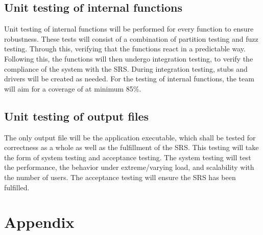 \documentclass[12pt, titlepage]{article}
\begin{document}
\subsection{Unit testing of internal functions}
Unit testing of internal functions will be performed for every function to ensure robustness. These tests will consist of a combination of partition testing and fuzz testing. Through this, verifying that the functions react in a predictable way. Following this, the functions will then undergo integration testing, to verify the compliance of the system with the SRS. During integration testing, stubs and drivers will be created as needed. For the testing of internal functions, the team will aim for a coverage of at minimum 85\%.

\subsection{Unit testing of output files}       
The only output file will be the application executable, which shall be tested for correctness as a whole as well as the fulfillment of the SRS. This testing will take the form of system testing and acceptance testing. The system testing will test the performance, the behavior under extreme/varying load, and scalability with the number of users. The acceptance testing will ensure the SRS has been fulfilled.



\newpage

\section{Appendix}


\end{document}
